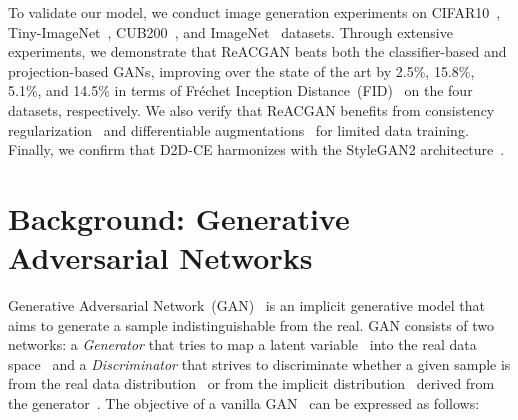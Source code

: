 \documentclass{article}
\begin{document}
To validate our model, we conduct image generation experiments on CIFAR10~\cite{Krizhevsky2009LearningML}, Tiny-ImageNet~\cite{Tiny}, CUB200~\cite{WelinderEtal2010}, and ImageNet~\cite{Deng2009ImageNetAL} datasets. Through extensive experiments, we demonstrate that ReACGAN beats both the classifier-based and projection-based GANs, improving over the state of the art by 2.5\%, 15.8\%, 5.1\%, and 14.5\% in terms of Fréchet Inception Distance~(FID)~\cite{Heusel2017GANsTB} on the four datasets, respectively. We also verify that ReACGAN benefits from consistency regularization~\cite{Zhang2019ConsistencyRF} and differentiable augmentations~\cite{zhao2020differentiable, Karras2020TrainingGA} for limited data training. Finally, we confirm that D2D-CE harmonizes with the StyleGAN2 architecture~\cite{karras2020analyzing}. \section{Background: Generative Adversarial Networks}
\label{sec:Backgroud_GAN}
Generative Adversarial Network~(GAN)~\cite{Goodfellow2014GenerativeAN} is an implicit generative model that aims to generate a sample indistinguishable from the real. GAN consists of two networks: a \emph{Generator}  that tries to map a latent variable~ into the real data space~ and a \emph{Discriminator}  that strives to discriminate whether a given sample is from the real data distribution~ or from the implicit distribution~ derived from the generator~. The objective of a vanilla GAN~\cite{Goodfellow2014GenerativeAN} can be expressed as follows:
\end{document}
